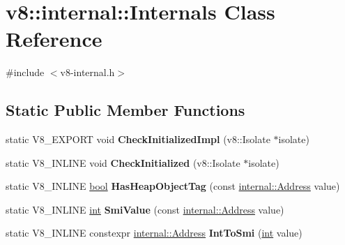 \hypertarget{classv8_1_1internal_1_1Internals}{}\section{v8\+:\+:internal\+:\+:Internals Class Reference}
\label{classv8_1_1internal_1_1Internals}


{\ttfamily \#include $<$v8-\/internal.\+h$>$}

\subsection*{Static Public Member Functions}
\begin{DoxyCompactItemize}
\item 
\mbox{\label{classv8_1_1internal_1_1Internals_ac5141eba7a786f0fa9f6db658f25d4ba}} 
static V8\+\_\+\+E\+X\+P\+O\+RT void {\bfseries Check\+Initialized\+Impl} (v8\+::\+Isolate $\ast$isolate)
\item 
\mbox{\label{classv8_1_1internal_1_1Internals_a1aa4bc86bc011f055fe27d18e0849b8c}} 
static V8\+\_\+\+I\+N\+L\+I\+NE void {\bfseries Check\+Initialized} (v8\+::\+Isolate $\ast$isolate)
\item 
\mbox{\label{classv8_1_1internal_1_1Internals_adcdb38643eb538a720dbee4e77acea15}} 
static V8\+\_\+\+I\+N\+L\+I\+NE \mbox{\hyperlink{classbool}{bool}} {\bfseries Has\+Heap\+Object\+Tag} (const \mbox{\hyperlink{classuintptr__t}{internal\+::\+Address}} value)
\item 
\mbox{\label{classv8_1_1internal_1_1Internals_a7489b2097139fa3f9dca4006178d7c0d}} 
static V8\+\_\+\+I\+N\+L\+I\+NE \mbox{\hyperlink{classint}{int}} {\bfseries Smi\+Value} (const \mbox{\hyperlink{classuintptr__t}{internal\+::\+Address}} value)
\item 
\mbox{\label{classv8_1_1internal_1_1Internals_ae78e94e88a1205fa9133434e60c7fcae}} 
static V8\+\_\+\+I\+N\+L\+I\+NE constexpr \mbox{\hyperlink{classuintptr__t}{internal\+::\+Address}} {\bfseries Int\+To\+Smi} (\mbox{\hyperlink{classint}{int}} value)
\item 
\mbox{\label{classv8_1_1internal_1_1Internals_a1d1d3013de2280bfd115a2600111714a}} 

\end{DoxyCompactItemize}
